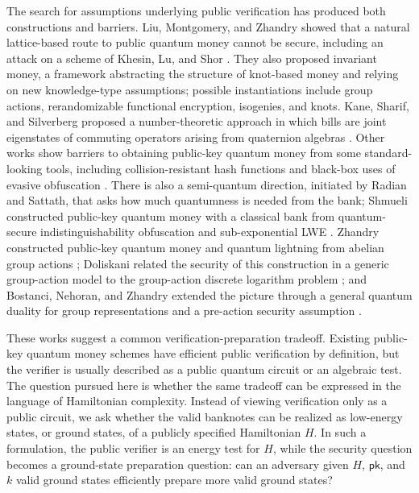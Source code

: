 \documentclass[12pt]{article}
\begin{document}
The search for assumptions underlying public verification has produced both constructions and barriers.
Liu, Montgomery, and Zhandry showed that a natural lattice-based route to public quantum money cannot be secure, including an attack on a scheme of Khesin, Lu, and Shor \cite{liuAnotherBreakingMaking2023}.
They also proposed invariant money, a framework abstracting the structure of knot-based money and relying on new knowledge-type assumptions; possible instantiations include group actions, rerandomizable functional encryption, isogenies, and knots.
Kane, Sharif, and Silverberg proposed a number-theoretic approach in which bills are joint eigenstates of commuting operators arising from quaternion algebras \cite{kaneQuantumMoneyQuaternion2022}.
Other works show barriers to obtaining public-key quantum money from some standard-looking tools, including collision-resistant hash functions and black-box uses of evasive obfuscation \cite{ananthImplausibilityPublicKey2023,zhandryQuantumMoneyEvasive2025}.
There is also a semi-quantum direction, initiated by Radian and Sattath, that asks how much quantumness is needed from the bank; Shmueli constructed public-key quantum money with a classical bank from quantum-secure indistinguishability obfuscation and sub-exponential LWE \cite{radianSemiQuantumMoney2019,shmueliPublicKeyQuantum2022}.
Zhandry constructed public-key quantum money and quantum lightning from abelian group actions \cite{zhandryQuantumMoneyAbelian2025}; 
Doliskani related the security of this construction in a generic group-action model to the group-action discrete logarithm problem \cite{doliskaniPublicKeyQuantum2025}; 
and Bostanci, Nehoran, and Zhandry extended the picture through a general quantum duality for group representations and a pre-action security assumption \cite{bostanciGeneralQuantumDuality2025}.

These works suggest a common verification-preparation tradeoff.
Existing public-key quantum money schemes have efficient public verification by definition, but the verifier is usually described as a public quantum circuit or an algebraic test.
The question pursued here is whether the same tradeoff can be expressed in the language of Hamiltonian complexity.
Instead of viewing verification only as a public circuit, we ask whether the valid banknotes can be realized as low-energy states, or ground states, of a publicly specified Hamiltonian $H$.
In such a formulation, the public verifier is an energy test for $H$, while the security question becomes a ground-state preparation question: can an adversary given $H$, $\mathsf{pk}$, and $k$ valid ground states efficiently prepare more valid ground states?
\end{document}
